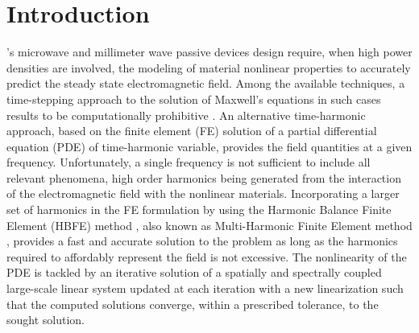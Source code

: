 \documentclass[journal]{IEEEtran}
\begin{document}
\section{Introduction}
% 
% 
% 
% 
% 
's microwave and millimeter wave passive devices design require, when high power densities are involved, the modeling of material nonlinear properties to accurately predict the steady state electromagnetic field.
Among the available techniques, a time-stepping approach to the solution of Maxwell's equations in such cases results to be computationally prohibitive %
\cite{deGersem2001}.
An alternative time-harmonic approach, based on the finite element (FE) solution of a partial differential equation (PDE) of time-harmonic variable, provides the field quantities at a given frequency. Unfortunately, a single frequency is not sufficient to include all relevant phenomena, high order harmonics being generated from the interaction of the electromagnetic field with the nonlinear materials. Incorporating a larger set of harmonics in the FE formulation by using the Harmonic Balance Finite Element (HBFE) method \cite{Yamada1988,Yamada1989}, also known as Multi-Harmonic Finite Element method \cite{Copeland2010, Bachinger2005, Kolmbauer2009}, provides a fast and accurate solution to the problem as long as the harmonics required to affordably represent the field is not excessive. The nonlinearity of the PDE is tackled by an iterative solution of a spatially and spectrally coupled large-scale linear system updated at each iteration with a new linearization such that the computed solutions converge, within a prescribed tolerance, to the sought solution. %
\end{document}
